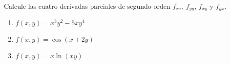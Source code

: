 Calcule las cuatro derivadas parciales de segundo orden $f_{xx}$, $f_{yy}$, $f_{xy}$ y $f_{yx}$.
\begin{enumerate}
    \item $f(x, y) = x^3 y^2 - 5xy^4$
    \item $f(x, y) = \cos(x + 2y)$
    \item $f(x, y) = x \ln(xy)$
\end{enumerate}

